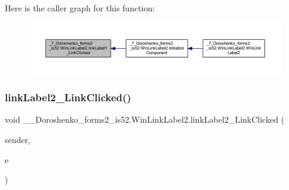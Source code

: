 Here is the caller graph for this function\+:
\nopagebreak
\begin{figure}[H]
\begin{center}
\leavevmode
\includegraphics[width=350pt]{class__7___doroshenko__forms2__is52_1_1_win_link_label2_a925937ae4cff4037bb5bfe92613de2f7_icgraph}
\end{center}
\end{figure}
\hypertarget{class__7___doroshenko__forms2__is52_1_1_win_link_label2_a678645f20d76113ee4986b67e8263edc}{}\label{class__7___doroshenko__forms2__is52_1_1_win_link_label2_a678645f20d76113ee4986b67e8263edc} 
\subsubsection{\texorpdfstring{link\+Label2\+\_\+\+Link\+Clicked()}{linkLabel2\_LinkClicked()}}
{\footnotesize\ttfamily void \+\_\+\_\+\+Doroshenko\+\_\+forms2\+\_\+is52.\+Win\+Link\+Label2.\+link\+Label2\+\_\+\+Link\+Clicked (\begin{DoxyParamCaption}\item[{object}]{sender,  }\item[{Link\+Label\+Link\+Clicked\+Event\+Args}]{e }\end{DoxyParamCaption})\hspace{0.3cm}{\ttfamily [private]}}

